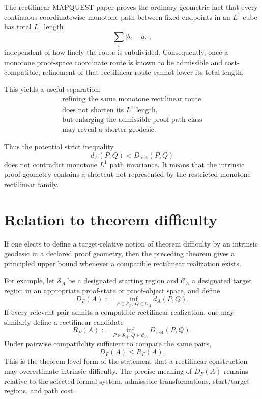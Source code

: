 \documentclass[11pt]{article}
\theoremstyle{definition}
\newcommand{\Drect}{D_{\mathrm{rect}}}
\newcommand{\distA}{d_A}
\begin{document}
The rectilinear MAPQUEST paper proves the ordinary geometric fact that every continuous coordinatewise monotone path between fixed endpoints in an $L^1$ cube has total $L^1$ length
\[
\sum_i |b_i-a_i|,
\]
independent of how finely the route is subdivided.  Consequently, once a monotone proof-space coordinate route is known to be admissible and cost-compatible, refinement of that rectilinear route cannot lower its total length.

This yields a useful separation:
\[
\boxed{
\begin{array}{c}
\text{refining the same monotone rectilinear route}
\\[2mm]
\text{does not shorten its }L^1\text{ length},
\\[4mm]
\text{but enlarging the admissible proof-path class}
\\[2mm]
\text{may reveal a shorter geodesic.}
\end{array}}
\]

Thus the potential strict inequality
\[
\distA(P,Q)<\Drect(P,Q)
\]
does not contradict monotone $L^1$ path invariance.  It means that the intrinsic proof geometry contains a shortcut not represented by the restricted monotone rectilinear family.

\section{Relation to theorem difficulty}

If one elects to define a target-relative notion of theorem difficulty by an intrinsic geodesic in a declared proof geometry, then the preceding theorem gives a principled upper bound whenever a compatible rectilinear realization exists.

For example, let $\mathcal S_A$ be a designated starting region and $\mathcal C_A$ a designated target region in an appropriate proof-state or proof-object space, and define
\[
D_F(A)
:=
\inf_{P\in\mathcal S_A,\,Q\in\mathcal C_A}
\distA(P,Q).
\]
If every relevant pair admits a compatible rectilinear realization, one may similarly define a rectilinear candidate
\[
R_F(A)
:=
\inf_{P\in\mathcal S_A,\,Q\in\mathcal C_A}
\Drect(P,Q).
\]
Under pairwise compatibility sufficient to compare the same pairs,
\[
\boxed{D_F(A)\le R_F(A).}
\]
This is the theorem-level form of the statement that a rectilinear construction may overestimate intrinsic difficulty.  The precise meaning of $D_F(A)$ remains relative to the selected formal system, admissible transformations, start/target regions, and path cost.
\end{document}
